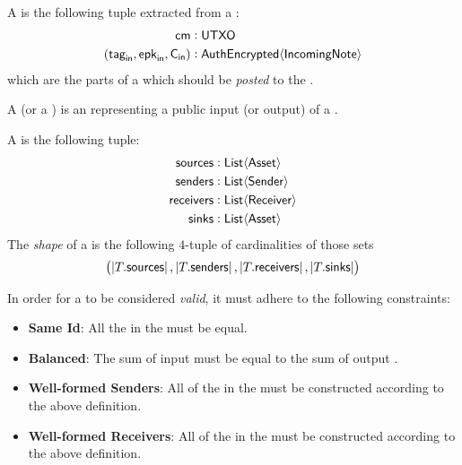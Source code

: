 \begin{definition}
    A \ReceiverPost{} is the following tuple extracted from a \Receiver{}:
    \begin{align*}
        {\textsf{cm}}                    &: {\textsf{UTXO}} \\
        ({{\textsf{tag}}_\textsf{in}}, {{\textsf{epk}}_\textsf{in}}, {\textsf{C}_\textsf{in}}) &: {\textsf{AuthEncrypted}}\langle{{\textsf{IncomingNote}}}\rangle
    \end{align*}
    which are the parts of a \Receiver{} which should be \emph{posted} to the \Ledger{}.
\end{definition}

\begin{definition}
    A \Source{} (or a \Sink{}) is an \Asset{} representing a public input (or output) of a \Transfer{}.
\end{definition}

\begin{definition}
    A \Transfer{} is the following tuple:
    \begin{align*}
        {\textsf{sources}}    &: {\textsf{List}}\langle{{\textsf{Asset}}}\rangle \\
        {\textsf{senders}}    &: {\textsf{List}}\langle{{\textsf{Sender}}}\rangle \\
        {\textsf{receivers}}  &: {\textsf{List}}\langle{{\textsf{Receiver}}}\rangle \\
        {\textsf{sinks}}      &: {\textsf{List}}\langle{{\textsf{Asset}}}\rangle
    \end{align*}
    The \emph{shape} of a \Transfer{} is the following $4$-tuple of cardinalities of those sets
    \[\left(\left|T.{\textsf{sources}}\right|, \left|T.{\textsf{senders}}\right|, \left|T.{\textsf{receivers}}\right|, \left|T.{\textsf{sinks}}\right|\right)\]
\end{definition}

In order for a \Transfer{} to be considered \emph{valid}, it must adhere to the following constraints:

\begin{itemize}
    \item \textbf{Same Id}: All the  in the \Transfer{} must be equal.
    \item \textbf{Balanced}: The sum of input  must be equal to the sum of output .
    \item \textbf{Well-formed Senders}: All of the  in the \Transfer{} must be constructed according to the above \Sender{} definition.
    \item \textbf{Well-formed Receivers}: All of the  in the \Transfer{} must be constructed according to the above \Receiver{} definition.
\end{itemize}

